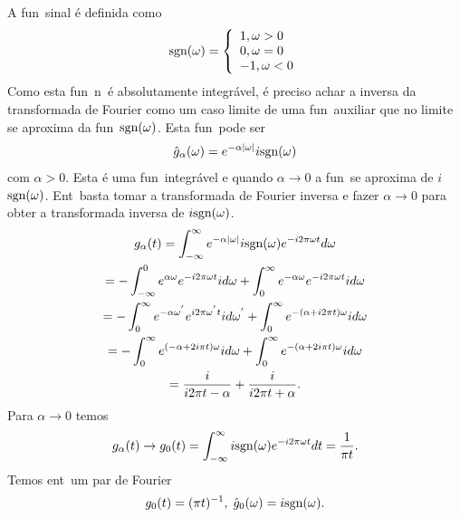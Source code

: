 A fun\cao\ sinal \'e definida como
\begin{eqnarray}
\mbox{sgn}(\omega) = \left\{
\begin{array}{ll}
1 , \omega > 0 \\
0 , \omega = 0 \\
-1 , \omega < 0
\end{array}
\right.
\end{eqnarray}
Como esta fun\cao\ n\ao\ \'e absolutamente integr\'avel, \'e
preciso achar a inversa da transformada de Fourier como um caso
limite de uma fun\cao\ auxiliar que no limite se aproxima da
fun\cao\ $\mbox{sgn}(\omega)$. Esta fun\cao\ pode ser
\begin{eqnarray}
\hat{g}_{\alpha}(\omega) = e^{-\alpha \mid \omega\mid}i \mbox{sgn}(\omega)
\end{eqnarray}
com $\alpha > 0$. Esta \'e uma fun\cao\ integr\'avel e quando
$\alpha\rightarrow 0$ a fun\cao\ se aproxima de $i$ $\mbox{sgn}(\omega)$.
Ent\ao\ basta tomar a transformada de Fourier inversa e fazer
$\alpha\rightarrow 0$ para obter a transformada inversa de $i\mbox{sgn}(\omega)$.
\begin{multline}
g_{\alpha}(t) = \int_{-\infty}^{\infty}e^{-\alpha \mid
\omega \mid}i\mbox{sgn}(\omega)e^{-i2\pi \omega t}d\omega \\
= -\int_{-\infty}^{0}e^{\alpha \omega}e^{-i2\pi \omega t}i d\omega +
\int_{0}^{\infty}e^{-\alpha \omega}e^{-i2\pi \omega t}i d\omega \\
= -\int_{0}^{\infty}e^{-\alpha \omega^{'}}e^{i2\pi \omega^{'}t}i d\omega^{'} +
\int_{0}^{\infty}e^{-(\alpha+i2\pi t)\omega}i d\omega \\
= -\int_{0}^{\infty}e^{(-\alpha+2i\pi t)\omega}i d\omega +
\int_{0}^{\infty}e^{-(\alpha + 2i\pi t)\omega}i d\omega \\
= \frac{i}{i2\pi t - \alpha} + \frac{i}{i2\pi t + \alpha}.
\end{multline}
Para $\alpha\rightarrow 0$ temos
\begin{eqnarray}
g_{\alpha}(t)\rightarrow g_{0}(t) = \int_{-\infty}^{\infty}i\mbox{sgn}(\omega)e^{-i2\pi \omega t}dt =
\frac{1}{\pi t}.
\end{eqnarray}
Temos ent\ao\ um par de Fourier
\begin{eqnarray}
g_{0}(t) = (\pi t)^{-1},\; \hat{g}_{0}(\omega) = i\mbox{sgn}(\omega).
\end{eqnarray}

